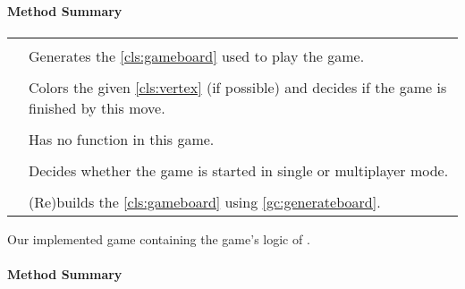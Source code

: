 \paragraph*{Method Summary}
\paragraph*{}
\begin{longtable}{Lp{10cm}}
	\startmethodtable
	 \\
	& Generates the \ref{cls:gameboard} used to play the game. \\
	 \\
	& Colors the given \ref{cls:vertex} (if possible) and decides if the game is finished by this move. \\
	 \\
	& Has no function in this game. \\
	 \\
	& Decides whether the game is started in single or multiplayer mode. \\
	 \\
	& (Re)builds the \ref{cls:gameboard} using \ref{gc:generateboard}. \\
	\hline
\end{longtable}

\pagebreak

Our implemented game containing the game's logic of \twixt. \\

\centerdash

\paragraph*{Method Summary}
